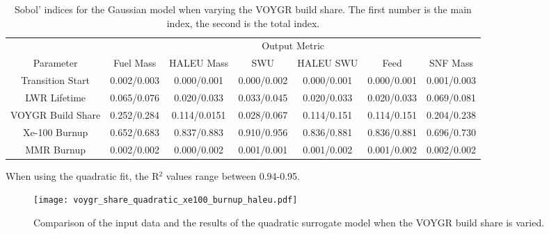 \begin{table}
    \centering
    \caption{Sobol' indices for the Gaussian model when varying the VOYGR 
    build share. The first number is the main index, the second is the total 
    index.}
    \label{tab:s7_sobol_voygr_gaussian}
    \begin{tabular}{c c c c c c c}
        \hline
        & \multicolumn{6}{c}{Output Metric} \\
        Parameter & Fuel Mass & HALEU Mass & SWU & HALEU SWU & Feed & SNF Mass \\
        \hline
        Transition Start & 0.002/0.003 & 0.000/0.001 & 0.000/0.002 & 
                           0.000/0.001 & 0.000/0.001 & 0.001/0.003\\
        LWR Lifetime & 0.065/0.076 & 0.020/0.033 & 0.033/0.045 & 
                       0.020/0.033 & 0.020/0.033 & 0.069/0.081\\
        VOYGR Build Share & 0.252/0.284 & 0.114/0.0151 & 0.028/0.067 &
                            0.114/0.151 & 0.114/0.151 & 0.204/0.238\\
        Xe-100 Burnup & 0.652/0.683 & 0.837/0.883 & 0.910/0.956 & 
                        0.836/0.881 & 0.836/0.881 & 0.696/0.730\\
        MMR Burnup & 0.002/0.002 & 0.000/0.002 & 0.001/0.001 & 
                     0.001/0.002 & 0.001/0.002 & 0.002/0.002\\
        \hline        
    \end{tabular}
\end{table}

When using the quadratic fit, the R$^2$ values range between 0.94-0.95. 

\begin{figure}
    \centering 
    \texttt{[image: voygr\_share\_quadratic\_xe100\_burnup\_haleu.pdf]}
    \caption{Comparison of the input data and the results of the quadratic 
    surrogate model when the VOYGR build share is varied.}
    \label{fig:s7_voygr_quadratic}
\end{figure}

